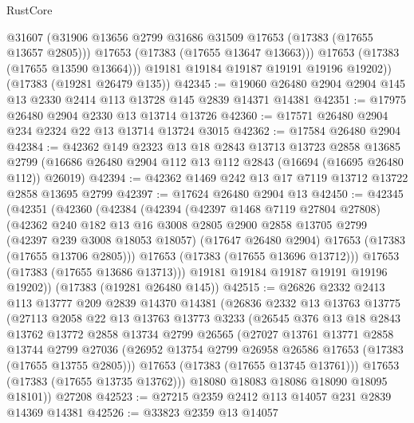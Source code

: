 \begin{lexlean}{RustCore}
\begin{coremodule}
            @31607
            (@31906 @13656 @2799 @31686 @31509 @17653 (@17383 (@17655 @13657 @2805)))
            @17653
            (@17383 (@17655 @13647 @13663)))
          @17653
          (@17383 (@17655 @13590 @13664)))
        @19181
        @19184
        @19187
        @19191
        @19196
        @19202))
    (@17383 (@19281 @26479 @135))
@42345 := @19060 @26480 @2904 @2904 @145 @13 @2330 @2414 @113 @13728 @145 @2839 @14371 @14381
@42351 := @17975 @26480 @2904 @2330 @13 @13714 @13726
@42360 := @17571 @26480 @2904 @234 @2324 @22 @13 @13714 @13724 @3015
@42362 := @17584 @26480 @2904
@42384 := @42362
    @149
    @2323
    @13
    @18
    @2843
    @13713
    @13723
    @2858
    @13685
    @2799
    (@16686 @26480 @2904 @112 @13 @112 @2843 (@16694 (@16695 @26480 @112)) @26019)
@42394 := @42362 @1469 @242 @13 @17 @7119 @13712 @13722 @2858 @13695 @2799
@42397 := @17624 @26480 @2904 @13
@42450 := @42345
    (@42351
      (@42360
        (@42384
          (@42394
            (@42397 @1468 @7119 @27804 @27808)
            (@42362
              @240
              @182
              @13
              @16
              @3008
              @2805
              @2900
              @2858
              @13705
              @2799
              (@42397 @239 @3008 @18053 @18057)
              (@17647 @26480 @2904)
              @17653
              (@17383 (@17655 @13706 @2805)))
            @17653
            (@17383 (@17655 @13696 @13712)))
          @17653
          (@17383 (@17655 @13686 @13713)))
        @19181
        @19184
        @19187
        @19191
        @19196
        @19202))
    (@17383 (@19281 @26480 @145))
@42515 := @26826
    @2332
    @2413
    @113
    @13777
    @209
    @2839
    @14370
    @14381
    (@26836
      @2332
      @13
      @13763
      @13775
      (@27113
        @2058
        @22
        @13
        @13763
        @13773
        @3233
        (@26545
          @376
          @13
          @18
          @2843
          @13762
          @13772
          @2858
          @13734
          @2799
          @26565
          (@27027
            @13761
            @13771
            @2858
            @13744
            @2799
            @27036
            (@26952 @13754 @2799 @26958 @26586 @17653 (@17383 (@17655 @13755 @2805)))
            @17653
            (@17383 (@17655 @13745 @13761)))
          @17653
          (@17383 (@17655 @13735 @13762)))
        @18080
        @18083
        @18086
        @18090
        @18095
        @18101))
    @27208
@42523 := @27215 @2359 @2412 @113 @14057 @231 @2839 @14369 @14381
@42526 := @33823 @2359 @13 @14057

\end{coremodule}
\end{lexlean}
